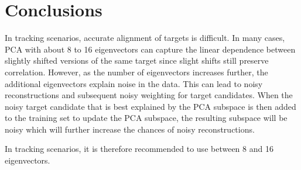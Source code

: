 \section{Conclusions}
In tracking scenarios, accurate alignment of targets is difficult.  In many cases, PCA with about 8 to 16 eigenvectors can capture the linear dependence between slightly shifted versions of the same target since slight shifts still preserve correlation.  However, as the number of eigenvectors increases further, the additional eigenvectors explain noise in the data.  This can lead to noisy reconstructions and subsequent noisy weighting for target candidates.  When the noisy target candidate that is best explained by the PCA subspace is then added to the training set to update the PCA subspace, the resulting subspace will be noisy which will further increase the chances of noisy reconstructions.  

In tracking scenarios, it is therefore recommended to use between 8 and 16 eigenvectors.


\normalsize






